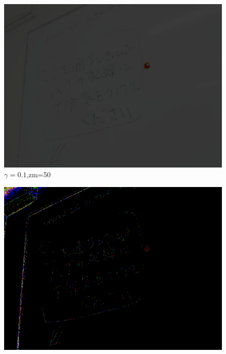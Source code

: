 ﻿\documentclass[a4j,11pt]{jarticle}
\begin{document}
\clearpage
\begin{figure}[tb]

 \begin{minipage}{0.49\hsize} %
   \center
   \includegraphics[width=\hsize]{./eps/contrast-notlinear-lowlow.eps}
  $\gamma=0.1$,zm=50
 \end{minipage}
 \begin{minipage}{0.49\hsize} %
   \center
 \end{minipage}
 \begin{minipage}{0.49\hsize} %
   \center
   \includegraphics[width=\hsize]{./eps/contrast-notlinear-highlow.eps}

\end{minipage}
\end{figure}
\end{document}
